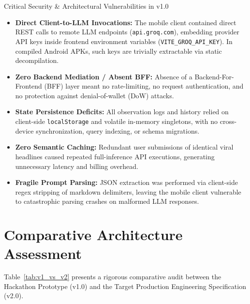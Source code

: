 \documentclass[11pt,a4paper]{report}
\begin{document}
\begin{warningBox}{Critical Security \& Architectural Vulnerabilities in v1.0}
    \begin{itemize}
        \item \textbf{Direct Client-to-LLM Invocations:} The mobile client contained direct REST calls to remote LLM endpoints (\texttt{api.groq.com}), embedding provider API keys inside frontend environment variables (\texttt{VITE\_GROQ\_API\_KEY}). In compiled Android APKs, such keys are trivially extractable via static decompilation.
        \item \textbf{Zero Backend Mediation / Absent BFF:} Absence of a Backend-For-Frontend (BFF) layer meant no rate-limiting, no request authentication, and no protection against denial-of-wallet (DoW) attacks.
        \item \textbf{State Persistence Deficits:} All observation logs and history relied on client-side \texttt{localStorage} and volatile in-memory singletons, with no cross-device synchronization, query indexing, or schema migrations.
        \item \textbf{Zero Semantic Caching:} Redundant user submissions of identical viral headlines caused repeated full-inference API executions, generating unnecessary latency and billing overhead.
        \item \textbf{Fragile Prompt Parsing:} JSON extraction was performed via client-side regex stripping of markdown delimiters, leaving the mobile client vulnerable to catastrophic parsing crashes on malformed LLM responses.
    \end{itemize}
\end{warningBox}

\section{Comparative Architecture Assessment}
Table~\ref{tab:v1_vs_v2} presents a rigorous comparative audit between the Hackathon Prototype (v1.0) and the Target Production Engineering Specification (v2.0).
\end{document}
